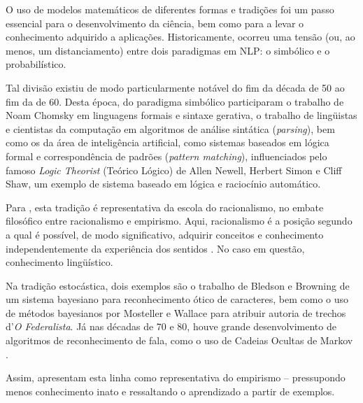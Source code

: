 	
	O uso de modelos matemáticos de diferentes formas e tradições foi um passo essencial para o desenvolvimento da ciência, bem como para a levar o conhecimento adquirido a aplicações. Historicamente, ocorreu uma tensão (ou, ao menos, um distanciamento) entre dois paradigmas em NLP: o simbólico e o probabilístico. 
	
		Tal divisão existiu de modo particularmente notável do fim da década de 50 ao fim da de 60. Desta época, do paradigma simbólico participaram o trabalho de Noam Chomsky em linguagens formais e sintaxe gerativa, o trabalho de lingüistas e cientistas da computação em algoritmos de análise sintática (\textit{parsing}), bem como os da área de inteligência artificial, como sistemas baseados em lógica formal e correspondência de padrões (\textit{pattern matching}), influenciados pelo famoso \textit{Logic Theorist} (Teórico Lógico) de Allen Newell, Herbert Simon e Cliff Shaw, um exemplo de sistema baseado em lógica e raciocínio automático.  
		
		Para \citet[pp.~4--7]{Manning:1999}, esta tradição é representativa da escola do racionalismo, no embate filosófico entre racionalismo e empirismo. Aqui, racionalismo é a posição segundo a qual é possível, de modo significativo, adquirir conceitos e conhecimento independentemente da experiência dos sentidos \citep{sep-rationalism-empiricism}. No caso em questão, conhecimento lingüístico.
%
	
		Na tradição estocástica, dois exemplos são o trabalho de Bledson e Browning de um sistema bayesiano para reconhecimento ótico de caracteres, bem como o uso de métodos bayesianos por Mosteller e Wallace para atribuir autoria de trechos d'\textit{O Federalista}. Já nas décadas de 70 e 80, houve grande desenvolvimento de algoritmos de reconhecimento de fala, como o uso de Cadeias Ocultas de Markov \citep[pp.10--11]{Jurafsky:2009}.
		
		Assim, \citet[pp.~4--7]{Manning:1999} apresentam esta linha como representativa do empirismo -- pressupondo menos conhecimento inato e ressaltando o aprendizado a partir de exemplos.
	
		
